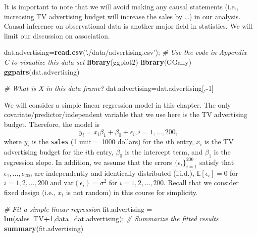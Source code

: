 \documentclass[12pt,]{book}
\newenvironment{Shaded}{\begin{snugshade}}{\end{snugshade}}
\newcommand{\KeywordTok}[1]{\textcolor[rgb]{0.13,0.29,0.53}{\textbf{#1}}}
\newcommand{\DataTypeTok}[1]{\textcolor[rgb]{0.13,0.29,0.53}{#1}}
\newcommand{\DecValTok}[1]{\textcolor[rgb]{0.00,0.00,0.81}{#1}}
\newcommand{\StringTok}[1]{\textcolor[rgb]{0.31,0.60,0.02}{#1}}
\newcommand{\CommentTok}[1]{\textcolor[rgb]{0.56,0.35,0.01}{\textit{#1}}}
\newcommand{\OperatorTok}[1]{\textcolor[rgb]{0.81,0.36,0.00}{\textbf{#1}}}
\newcommand{\NormalTok}[1]{#1}
\begin{document}
It is important to note that we will avoid making any causal statements
(i.e., increasing TV advertising budget will increase the sales by
\ldots{}) in our analysis. Causal inference on observational data is
another major field in statistics. We will limit our discussion on
association.

\begin{Shaded}
\begin{Highlighting}[]
\NormalTok{dat.advertising=}\KeywordTok{read.csv}\NormalTok{(}\StringTok{'./data/advertising.csv'}\NormalTok{);}
\CommentTok{# Use the code in Appendix C to visualize this data set}
\KeywordTok{library}\NormalTok{(ggplot2)}
\KeywordTok{library}\NormalTok{(GGally)}
\KeywordTok{ggpairs}\NormalTok{(dat.advertising)}
\end{Highlighting}
\end{Shaded}

\begin{Shaded}
\begin{Highlighting}[]
\CommentTok{# What is X in this data frame?}
\NormalTok{dat.advertising=dat.advertising[,}\OperatorTok{-}\DecValTok{1}\NormalTok{]}
\end{Highlighting}
\end{Shaded}

We will consider a simple linear regression model in this chapter. The
only covariate/predictor/independent variable that we use here is the TV
advertising budget. Therefore, the model is \[
    y_i = x_i \beta_1  +\beta_0 +  \epsilon_i, i=1,\ldots, 200,
    \] where \(y_i\) is the \texttt{sales} (1 unit = 1000 dollars) for
the \(i\)th entry, \(x_i\) is the TV advertising budget for the \(i\)th
entry, \(\beta_0\) is the intercept term, and \(\beta_1\) is the
regression slope. In addition, we assume that the errors
\(\{\epsilon_i\}_{i=1}^{200}\) satisfy that
\(\epsilon_1,\ldots, \epsilon_{200}\) are independently and identically
distributed (i.i.d.), \(\mathbb{E}[\epsilon_i]= 0\) for
\(i=1,2,\ldots, 200\) and \(\mathrm{var}(\epsilon_i)=\sigma^2\) for
\(i=1,2,\ldots, 200\). Recall that we consider fixed design (i.e.,
\(x_i\) is not random) in this course for simplicity.

\begin{Shaded}
\begin{Highlighting}[]
\CommentTok{# Fit a simple linear regression}
\NormalTok{fit.advertising =}\StringTok{ }\KeywordTok{lm}\NormalTok{(sales}\OperatorTok{~}\NormalTok{TV}\OperatorTok{+}\DecValTok{1}\NormalTok{,}\DataTypeTok{data=}\NormalTok{dat.advertising); }
\CommentTok{# Summarize the fitted results}
\KeywordTok{summary}\NormalTok{(fit.advertising) }
\end{Highlighting}
\end{Shaded}
\end{document}
